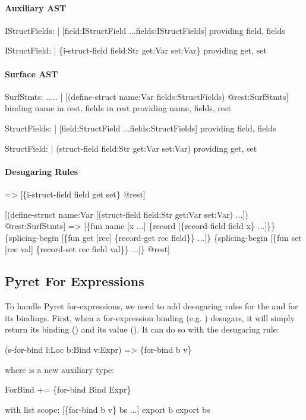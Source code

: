 

\paragraph{Auxiliary AST}
\begin{Codes}
IStructFields:
| [field:IStructField ...fields:IStructFields]
  providing field, fields

IStructField:
| \{i-struct-field field:Str get:Var set:Var\}
  providing get, set
\end{Codes}

\paragraph{Surface AST}
\begin{Codes}
SurfStmts:
  .....
| [(define-struct name:Var fields:StructFields) @rest:SurfStmts]
  binding name in rest, fields in rest
  providing name, fields, rest

StructFields:
| [field:StructField ...fields:StructFields]
  providing field, fields

StructField:
| (struct-field field:Str get:Var set:Var)
  providing get, set
\end{Codes}

\paragraph{Desugaring Rules}
\begin{Codes}
=> [\{i-struct-field field get set\} @rest]
  
   [(define-struct name:Var
      [(struct-field field:Str get:Var set:Var) ...]) @rest:SurfStmts]
=> [\{fun name [x ...] \{record [\{record-field field x\} ...]\}\}
    \{splicing-begin [\{fun get [rec] \{record-get rec field\}\} ...]\}
    \{splicing-begin [\{fun set [rec val] \{record-set rec field val\}\} ...]\}
    @rest]
\end{Codes}

\subsection{Pyret For Expressions}

To handle Pyret for-expressions, we need to add desugaring rules for
the  and for its bindings. 
First, when a for-expression binding (e.g. ) desugars,
it will simply return its binding () and its value ().
It can do so with the desugaring rule:
\begin{Codes}
   (s-for-bind l:Loc b:Bind v:Expr)
=> \{for-bind b v\}
\end{Codes}
where  is a new auxiliary type:
\begin{Codes}
ForBind += \{for-bind Bind Expr\}

with list scope:
  [\{for-bind b v\} bs ...]
  export b
  export bs
\end{Codes}

